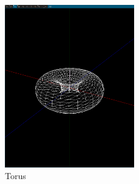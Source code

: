 \documentclass[14pt, a4 paper]{article}
\begin{document}
\begin{figure}[ht]
\centering
\includegraphics[width=0.5\textwidth]{images/6.png}
\caption{Torus}
\end{figure}
\end{document}

